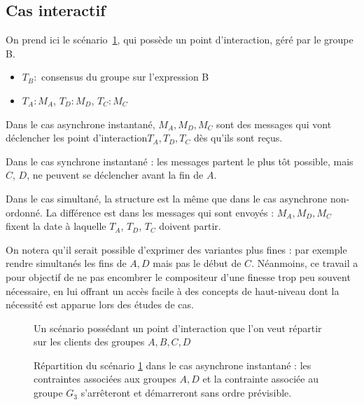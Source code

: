 \documentclass{article}
\newcommand\trigger{point d'interaction\xspace}
\begin{document}
\subsection{Cas interactif}
On prend ici le scénario~\ref{scenar.depl-interactif}, qui possède un \trigger, géré par le groupe B.
 
\begin{itemize}
	\item $T_B: $ consensus du groupe sur l'expression B
	\item $T_A: M_A$, $T_D: M_D$, $T_C: M_C$
\end{itemize}

Dans le cas asynchrone instantané, $M_A, M_D, M_C$ sont des messages qui vont déclencher les \trigger $T_A, T_D, T_C$ dès qu'ils sont reçus.

Dans le cas synchrone instantané : les messages partent le plus tôt possible, mais $C$, $D$, ne peuvent se déclencher avant la fin de $A$.

Dans le cas simultané, la structure est la même que dans le cas asynchrone non-ordonné. La différence est dans les messages qui sont envoyés : $M_A, M_D, M_C$ fixent la date à laquelle $T_A$, $T_D$, $T_C$ doivent partir.

On notera qu'il serait possible d'exprimer des variantes plus fines : par exemple rendre simultanés les fins de $A,D$ mais pas le début de $C$. 
Néanmoins, ce travail a pour objectif de ne pas encombrer le compositeur d'une finesse trop peu souvent nécessaire, en lui offrant un accès facile à des concepts de haut-niveau dont la nécessité est apparue lors des études de cas.

\begin{figure}[h]
	\centering
		\begin{tikzpicture}
		
		\end{tikzpicture}
		\caption{Un scénario possédant un \trigger que l'on veut répartir sur les clients des groupes $A,B,C,D$}
	\label{scenar.depl-interactif}
\end{figure}

\begin{figure}[h]
	\centering
		\caption{Répartition du scénario \ref{scenar.depl-interactif} dans le cas asynchrone instantané : les contraintes associées aux groupes $A,D$ et la contrainte associée au groupe $G_3$ s'arrêteront et démarreront sans ordre prévisible.}
\end{figure}
\end{document}
